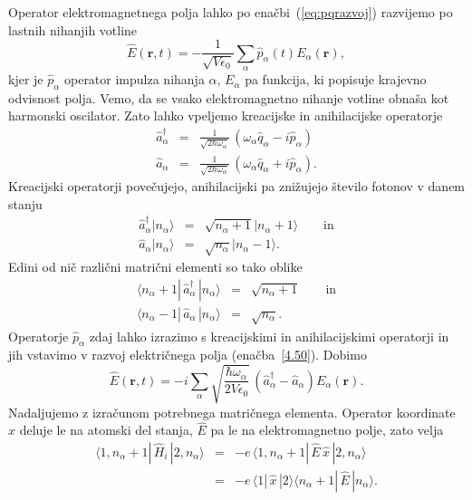 Operator elektromagnetnega polja lahko po enačbi~(\ref{eq:pqrazvoj}) 
razvijemo po lastnih nihanjih votline 
\begin{equation}
\hat{E}(\mathbf{r},t)=-\frac{1}{\sqrt{V\epsilon_{0}}}\sum_{\alpha}
\hat{p}_{\alpha}(t)E_{\alpha}(\mathbf{r}),
\label{4.50}
\end{equation}
kjer je $\hat{p}_{\alpha}$ operator impulza nihanja $\alpha$, $E_{\alpha}$
pa funkcija, ki popisuje krajevno odvisnost polja. Vemo, da se vsako 
elektromagnetno nihanje votline obnaša kot harmonski oscilator.
Zato lahko vpeljemo kreacijske in anihilacijske operatorje
\begin{eqnarray}
\hat{a}_{\alpha}^{\dagger} & = & \frac{1}{\sqrt{2\hbar\omega_{\alpha}}}\,
(\omega_{\alpha}\hat{q}_{\alpha}-i\hat{p}_{\alpha}) \\
\hat{a}_{\alpha} & = & \frac{1}{\sqrt{2\hbar\omega_{\alpha}}}\,(\omega_{\alpha}\hat{q}_{\alpha}+i\hat{p}_{\alpha}).
\end{eqnarray}
 Kreacijski operatorji povečujejo, anihilacijski pa znižujejo število
fotonov v danem stanju
\begin{eqnarray}
\hat{a}_{\alpha}^{\dagger}|n_{\alpha}\rangle & = & \sqrt{n_{\alpha}+1}
|n_{\alpha}+1\rangle\qquad \mathrm{in} \\
\hat{a}_{\alpha}|n_{\alpha}\rangle & = & \sqrt{n_{\alpha}}|n_{\alpha}-1\rangle.
\end{eqnarray}
Edini od nič različni matrični elementi so tako oblike
\begin{eqnarray}
\langle n_\alpha +1|\, \hat{a}_{\alpha}^{\dagger}\,|n_{\alpha}\rangle & = 
& \sqrt{n_{\alpha}+1} \qquad \mathrm{in} \nonumber\\
\langle n_\alpha-1|\,\hat{a}_{\alpha}\,|n_{\alpha}\rangle & = & \sqrt{n_{\alpha}}.
\label{eq:ankr}
\end{eqnarray}
Operatorje $\hat{p}_{\alpha}$ zdaj lahko izrazimo s kreacijskimi in anihilacijskimi
operatorji in jih vstavimo v razvoj električnega polja (enačba~\ref{4.50}). Dobimo
\begin{equation}
\hat{E}(\mathbf{r},t)=-i\sum_{\alpha}\sqrt{\frac{\hbar\omega_{\alpha}}{2V\epsilon_{0}}}\,
\left(\hat{a}_{\alpha}^{\dagger}-\hat{a}_{\alpha}\right)E_{\alpha}(\mathbf{r}).
\label{4.53}
\end{equation}
Nadaljujemo z izračunom potrebnega matričnega elementa. Operator koordinate
$\hat{x}$ deluje le na atomski del stanja, $\hat{E}$ pa le na elektromagnetno
polje, zato velja 
\begin{eqnarray}
\langle1,n_{\alpha}+1|\,\hat{H}_{i}\,|2,n_{\alpha}\rangle & = & -e\,
\langle1,n_{\alpha}+1|\,\hat{E}\,\hat{x}\,|2,n_{\alpha}\rangle \\
 & = & -e\,\langle1|\,\hat{x}\,|2\rangle\langle n_{\alpha}+1|\,\hat{E}\,|n_{\alpha}\rangle.
\end{eqnarray}
